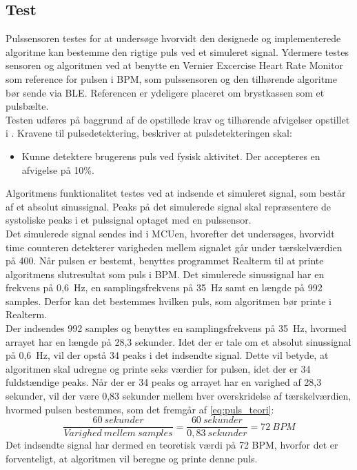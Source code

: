 \subsection{Test}
Pulssensoren testes for at undersøge hvorvidt den designede og implementerede algoritme kan bestemme den rigtige puls ved et simuleret signal. Ydermere testes sensoren og algoritmen ved at benytte en Vernier Excercise Heart Rate Monitor som reference for pulsen i BPM, som pulssensoren og den tilhørende algoritme bør sende via BLE. Referencen er ydeligere placeret om brystkassen som et pulsbælte. \\
Testen udføres på baggrund af de opstillede krav og tilhørende afvigelser opstillet i . Kravene til pulsedetektering, beskriver at pulsdetekteringen skal:
\begin{itemize}
\item Kunne detektere brugerens puls ved fysisk aktivitet. Der accepteres en afvigelse på 10\%.
\end{itemize}
Algoritmens funktionalitet testes ved at indsende et simuleret signal, som består af et absolut sinussignal. Peaks på det simulerede signal skal repræsentere de systoliske peaks i et pulssignal optaget med en pulssensor.\\
Det simulerede signal sendes ind i MCUen, hvorefter det undersøges, hvorvidt time counteren detekterer varigheden mellem signalet går under tærskelværdien på 400. Når pulsen er bestemt, benyttes programmet Realterm til at printe algoritmens slutresultat som puls i BPM. Det simulerede sinussignal har en frekvens på 0,6~Hz, en samplingsfrekvens på 35~Hz samt en længde på 992 samples. Derfor kan det bestemmes hvilken puls, som algoritmen bør printe i Realterm. \\
Der indsendes 992 samples og benyttes en samplingsfrekvens på 35~Hz, hvormed arrayet har en længde på 28,3 sekunder. Idet der er tale om et absolut sinussignal på 0,6~Hz, vil der opstå 34 peaks i det indsendte signal. Dette vil betyde, at algoritmen skal udregne og printe seks værdier for pulsen, idet der er 34 fuldstændige peaks. Når der er 34 peaks og arrayet har en varighed af 28,3 sekunder, vil der være 0,83 sekunder mellem hver overskridelse af tærskelværdien, hvormed pulsen bestemmes, som det fremgår af \eqref{eq:puls_teori}:
\begin{equation}
\frac{60~sekunder}{Varighed~mellem~samples} = \frac{60~sekunder}{0,83~sekunder} = 72~BPM
\label{eq:puls_teori}
\end{equation} 
Det indsendte signal har dermed en teoretisk værdi på 72 BPM, hvorfor det er forventeligt, at algoritmen vil beregne og printe denne puls.

